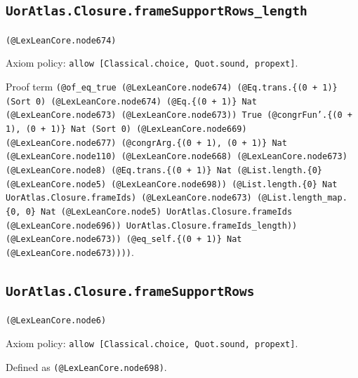 \documentclass[11pt]{article}
\begin{document}
\subsection*{\texttt{UorAtlas.Closure.frameSupportRows\_length}}
\noindent\texttt{(@LexLeanCore.node674)}\par
\noindent Axiom policy: \texttt{allow [Classical.choice, Quot.sound, propext]}.\par
\noindent Proof term \texttt{(@of\_eq\_true (@LexLeanCore.node674) (@Eq.trans.\{(0 + 1)\} (Sort 0) (@LexLeanCore.node674) (@Eq.\{(0 + 1)\} Nat (@LexLeanCore.node673) (@LexLeanCore.node673)) True (@congrFun'.\{(0 + 1), (0 + 1)\} Nat (Sort 0) (@LexLeanCore.node669) (@LexLeanCore.node677) (@congrArg.\{(0 + 1), (0 + 1)\} Nat (@LexLeanCore.node110) (@LexLeanCore.node668) (@LexLeanCore.node673) (@LexLeanCore.node8) (@Eq.trans.\{(0 + 1)\} Nat (@List.length.\{0\} (@LexLeanCore.node5) (@LexLeanCore.node698)) (@List.length.\{0\} Nat UorAtlas.Closure.frameIds) (@LexLeanCore.node673) (@List.length\_map.\{0, 0\} Nat (@LexLeanCore.node5) UorAtlas.Closure.frameIds (@LexLeanCore.node696)) UorAtlas.Closure.frameIds\_length)) (@LexLeanCore.node673)) (@eq\_self.\{(0 + 1)\} Nat (@LexLeanCore.node673))))}.\par
\subsection*{\texttt{UorAtlas.Closure.frameSupportRows}}
\noindent\texttt{(@LexLeanCore.node6)}\par
\noindent Axiom policy: \texttt{allow [Classical.choice, Quot.sound, propext]}.\par
\noindent Defined as \texttt{(@LexLeanCore.node698)}.\par
\end{document}
